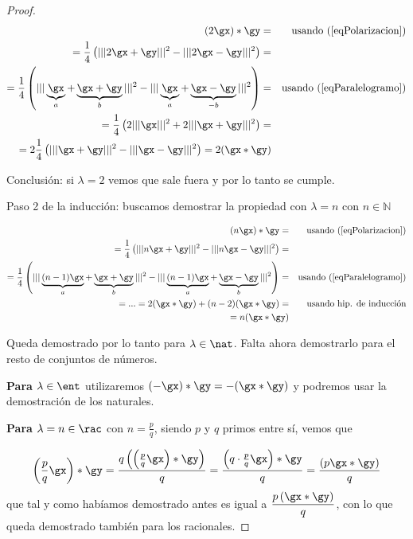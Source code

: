 \documentclass{apuntes}
\begin{document}
\begin{proof}
\begin{align*}
(2\gx)\ast\gy = && \text{usando (\ref{eqPolarizacion})} \\
= \frac{1}{4} \left(|||2\gx+\gy |||^2 - |||2\gx-\gy |||^2\right) = && \\
= \frac{1}{4} \left(|||\underbrace{\gx}_a + \underbrace{\gx+\gy}_b|||^2 - |||\underbrace{\gx}_a+\underbrace{\gx-\gy}_{-b}|||^2\right) = && \text{usando (\ref{eqParalelogramo})} \\
= \frac{1}{4} \left(2|||\gx|||^2 + 2|||\gx + \gy|||^2\right) = && \\
= 2 \frac{1}{4} \left(|||\gx+\gy|||^2 - |||\gx-\gy|||^2\right) = 2 (\gx\ast\gy) &&
\end{align*}

Conclusión: si $\lambda = 2$ vemos que sale fuera y por lo tanto se cumple.

Paso 2 de la inducción: buscamos demostrar la propiedad con $\lambda = n$ con $n \in \mathbb{N}$

\begin{align*}
(n\gx)\ast\gy = && \text{usando (\ref{eqPolarizacion})} \\
= \frac{1}{4} \left(|||n\gx+\gy|||^2 - |||n\gx-\gy|||^2\right) = && \\
= \frac{1}{4} \left(|||\underbrace{(n-1)\gx}_a+\underbrace{\gx+\gy}_b|||^2 
		- ||| \underbrace{(n-1)\gx}_a+ \underbrace{\gx-\gy}_b|||^2\right)= && \text{usando (\ref{eqParalelogramo})} \\
=...=2(\gx\ast\gy) + (n-2)(\gx\ast\gy) = && \text{usando hip. de inducción}\\
= n (\gx\ast\gy)
\end{align*}

Queda demostrado por lo tanto para $\lambda \in \nat$. Falta ahora demostrarlo para el resto de conjuntos de números.

\textbf{Para $\lambda \in \ent$} utilizaremos $(-\gx) \ast \gy = - (\gx\ast\gy)$ y podremos usar la demostración de los naturales.

\textbf{Para $\lambda = n \in \rac$} con $n = \frac{p}{q}$, siendo $p$ y $q$ primos entre sí, vemos que 

\[ \left(\frac{p}{q}\gx\right)\ast\gy = \frac{q\left(\left(\frac{p}{q}\gx\right)\ast\gy\right)}{q} = \frac{\left(q\cdot\frac{p}{q}\gx\right)\ast\gy}{q} = \frac{\left(p\gx\ast\gy\right)}{q} \] que tal y como habíamos demostrado antes es igual a $ \dfrac{p\left(\gx\ast\gy\right)}{q} $, con lo que queda demostrado también para los racionales.


\end{proof}
\end{document}
